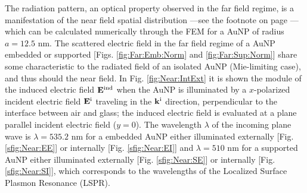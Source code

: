 The radiation pattern, an optical property observed in the far field regime, is a manifestation of the near field spatial distribution ---see the footnote on page \pageref{fnote:Stratton:Chu}--- which can be calculated numerically through the FEM for a AuNP of radius $a = 12.5$ nm. The scattered electric field in the  far field regime of a AuNP embedded or supported  [Figs. \ref{fig:Far:Emb:Norm} and \ref{fig:Far:Sup:Norm}] share some characteristic to the radiated field of an isolated AuNP (Mie-limiting case), and thus should the near field. In Fig. \ref{fig:Near:IntExt} it is shown the module of the induced electric field $\vb{E}^\text{ind}$ when the AuNP is illuminated by a $x$-polarized incident electric field $\vb{E}^\text{i}$ traveling in the $\vb{k}^\text{i}$ direction, perpendicular to the interface between air and glass; the induced electric field is evaluated at a plane parallel incident electric field ($y = 0$). The wavelength $\lambda$ of the incoming plane wave is $\lambda =535.2$ nm for a embedded AuNP either illuminated externally [Fig.  \ref{sfig:Near:EE}] or internally  [Fig.  \ref{sfig:Near:EI}] and  $\lambda =510$ nm for a supported AuNP either illuminated externally [Fig.  \ref{sfig:Near:SE}] or internally  [Fig.  \ref{sfig:Near:SI}], which corresponds to the wavelengths of the Localized Surface Plasmon Resonance (LSPR).

